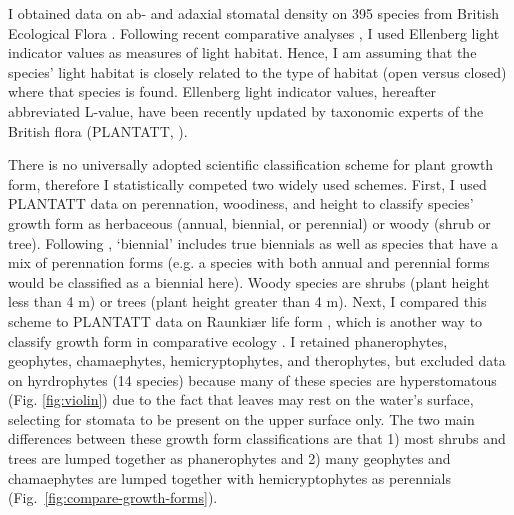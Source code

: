 \documentclass[12pt, oneside]{article}
\newcommand{\el}{L-value}
\begin{document}
I obtained data on ab- and adaxial stomatal density on 395 species from British Ecological Flora \citep{Salisbury_1927, Fitter_Peat_1994a, BEF}. Following recent comparative analyses \citep[e.g.][]{Niinemets_Valladares_2006, Bartelheimer_Poschlod_2016, Shipley_etal_2017}, I used Ellenberg light indicator values \citep{Ellenberg_1974} as measures of light habitat. Hence, I am assuming that the species' light habitat is closely related to the type of habitat (open versus closed) where that species is found. Ellenberg light indicator values, hereafter abbreviated \el, have been recently updated by taxonomic experts of the British flora (PLANTATT, \cite{Hill_etal_2004}). 

There is no universally adopted scientific classification scheme for plant growth form, therefore I statistically competed two widely used schemes. First, I used PLANTATT data on perennation, woodiness, and height to classify species' growth form as herbaceous (annual, biennial, or perennial) or woody (shrub or tree). Following \cite{Muir_2015}, `biennial' includes true biennials as well as species that have a mix of perennation forms (e.g. a species with both annual and perennial forms would be classified as a biennial here). Woody species are shrubs (plant height less than 4 m) or trees (plant height greater than 4 m). Next, I compared this scheme to PLANTATT data on Raunki\ae r life form \citep{Raunkiaer_1934}, which is another way to classify growth form in comparative ecology \citep[e.g.][]{Peat_Fitter_1994b, Salguero-Gomez_etal_2016}. I retained phanerophytes, geophytes, chamaephytes, hemicryptophytes, and therophytes, but excluded data on hyrdrophytes (14 species) because many of these species are hyperstomatous (Fig. \ref{fig:violin}) due to the fact that leaves may rest on the water's surface, selecting for stomata to be present on the upper surface only. The two main differences between these growth form classifications are that 1) most shrubs and trees are lumped together as phanerophytes and 2) many geophytes and chamaephytes are lumped together with hemicryptophytes as perennials (Fig.~\ref{fig:compare-growth-forms}). 
\end{document}
